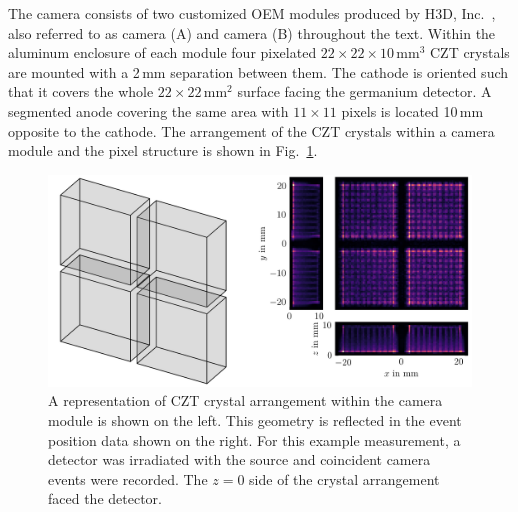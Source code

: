 The camera consists of two customized OEM modules produced by H3D, Inc.~\cite{H3D}, also referred to as camera (A) and camera (B) throughout the text. Within the aluminum enclosure of each module four pixelated $22\times22\times10\,\text{mm}^3$ CZT crystals are mounted with a 2\,mm separation between them. The cathode is oriented such that it covers the whole $22\times22\,\text{mm}^2$ surface facing the germanium detector. A segmented anode covering the same area with $11\times11$ pixels is located 10\,mm opposite to the cathode. The arrangement of the CZT crystals within a camera module and the pixel structure is shown in Fig.~\ref{fig:camera}.
\begin{figure}[!tbh]
	\centering
	\includegraphics[width=6in]{figs/scanner/caemra.png}
	\caption{A representation of CZT crystal arrangement within the camera module is shown on the left. This geometry is reflected in the event position data shown on the right. For this example measurement, a detector was irradiated with the \CsS{} source and coincident camera events were recorded. The $z=0$ side of the crystal arrangement faced the detector.}
	\label{fig:camera}
\end{figure} 

